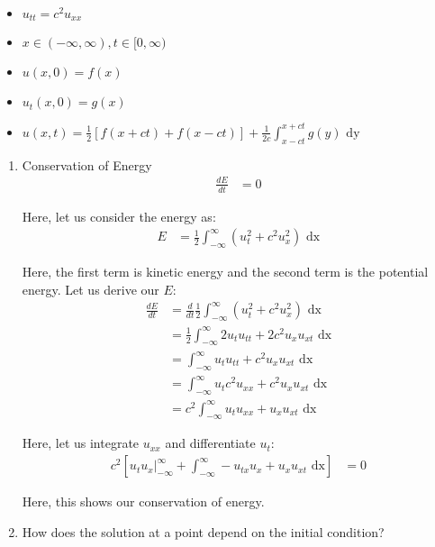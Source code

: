 %
\begin{itemize}
  \item $u_{tt} = c^2 u_{xx}$
  \item $x \in (-\infty, \infty), t \in [0, \infty)$
  \item $u(x, 0) = f(x)$
  \item $u_t(x, 0) = g(x)$
  \item $\displaystyle u(x, t) = \frac{1}{2} \left[ f(x + ct) + f(x - ct) \right] + \frac{1}{2c} \int^{x + ct}_{x - ct} g(y) \text{ dy}$
\end{itemize}
%
\begin{enumerate}
  \item Conservation of Energy
  \begin{align}
    \frac{dE}{dt} & = 0
  \end{align}

  Here, let us consider the energy as:
  \begin{align}
    E & = \frac{1}{2} \int^\infty_{-\infty} (u^2_t + c^2 u^2_x) \text{ dx}
  \end{align}

  Here, the first term is kinetic energy and the second term is the potential energy. Let us derive our $E$:
  \begin{align}
    \frac{dE}{dt}
    & = \frac{d}{dt} \frac{1}{2} \int^\infty_{-\infty} (u^2_t + c^2 u^2_x) \text{ dx}\\
    & = \frac{1}{2} \int^\infty_{-\infty} 2u_t u_{tt} + 2 c^2 u_x u_{xt} \text{ dx}\\
    & = \int^\infty_{-\infty} u_t u_{tt} + c^2 u_x u_{xt} \text{ dx}\\
    & = \int^\infty_{-\infty} u_t c^2 u_{xx} + c^2 u_x u_{xt} \text{ dx}\\
    & = c^2 \int^\infty_{-\infty} u_t u_{xx} + u_x u_{xt} \text{ dx}
  \end{align}

  Here, let us integrate $u_{xx}$ and differentiate $u_t$:
  \begin{align}
    c^2
    \left[
     u_t u_x \Big|^\infty_{-\infty} + \int^\infty_{-\infty} - u_{tx} u_x + u_x u_{xt} \text{ dx}
    \right]
    & = 0
  \end{align}

  Here, this shows our conservation of energy.
  \item {}

  How does the solution at a point depend on the initial condition?


\end{enumerate}

